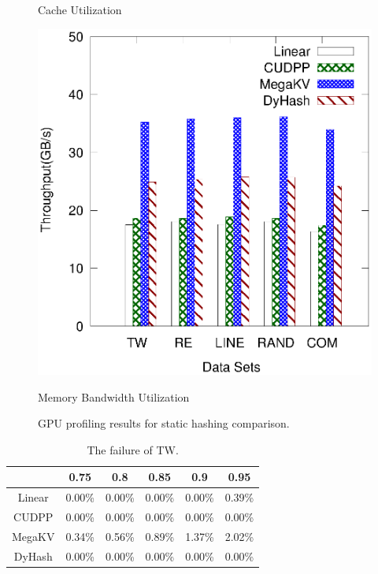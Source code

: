 \begin{figure}[h]
\begin{minipage}{0.3\linewidth}
	\centerline{Cache Utilization}
\end{minipage}
	\hfill
	\begin{minipage}{0.3\linewidth}\centering
	\includegraphics[width=\linewidth]{pic/static-profi/memory-read.eps}
	\centerline{Memory Bandwidth Utilization}
	\end{minipage}
	\caption{GPU profiling results for static hashing comparison.}
	\label{fig:static:profile}
\end{figure}



\begin{table}[H]
 	\caption{The failure of TW.}
	\centering
       \begin{tabular}{|c|c|c|c|c|c|}
		\hline
		       & 0.75 & 0.8 & 0.85 & 0.9 & 0.95\\ \hline
		Linear &0.00\% & 0.00\% &0.00\%  & 0.00\% & 0.39\% \\ \hline
		CUDPP & 0.00\% & 0.00\% &0.00\%  & 0.00\% & 0.00\% \\ \hline
		MegaKV & 0.34\% & 0.56\% &0.89\%  & 1.37\% & 2.02\% \\ \hline
		DyHash &0.00\% & 0.00\% &0.00\%  & 0.00\% & 0.00\% \\ \hline
	\end{tabular}
	\label{tab:fail:tw}
\end{table}


